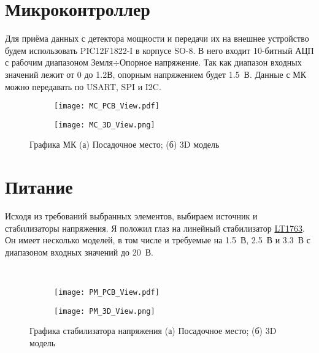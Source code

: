 \section{Микроконтроллер}

Для приёма данных с детектора мощности и передачи их на внешнее устройство будем использовать PIC12F1822-I в корпусе SO-8. В него входит 10-битный АЦП с рабочим диапазоном Земля$\div$Опорное напряжение. Так как диапазон входных значений лежит от 0 до 1.2В, опорным напряжением будет 1.5~В. Данные с МК можно передавать по USART, SPI и I2C.


\begin{figure}[H]
	\centering
	\begin{subfigure}[b]{0.45\textwidth}
		\centering
		\texttt{[image: MC\_PCB\_View.pdf]}
		\caption{}%
		\label{fig:MC_PCB_View}
	\end{subfigure}
	\hfill
	\begin{subfigure}[b]{0.45\textwidth}
		\centering
		\texttt{[image: MC\_3D\_View.png]}
		\caption{}%
		\label{fig:MC_3D_View}
	\end{subfigure}
	\caption{%
		Графика МК
		(а) Посадочное место;
		(б) 3D модель
	}%
	\label{fig:MC_footprint}
\end{figure}

\section{Питание}

Исходя из требований выбранных элементов, выбираем источник и стабилизаторы напряжения. Я положил глаз на линейный стабилизатор \href{https://www.analog.com/ru/products/lt1763.html}{LT1763}. Он имеет несколько моделей, в том числе и требуемые на 1.5~В, 2.5~В и 3.3~В с диапазоном входных значений до 20~В.

\begin{figure}[H]
	\centering\
	\begin{subfigure}[b]{0.45\textwidth}
		\centering
		\texttt{[image: PM\_PCB\_View.pdf]}
		\caption{}%
		\label{fig:PM_PCB_View}
	\end{subfigure}
	\hfill
	\begin{subfigure}[b]{0.45\textwidth}
		\centering
		\texttt{[image: PM\_3D\_View.png]}
		\caption{}%
		\label{fig:PM_3D_View}
	\end{subfigure}
	\caption{%
		Графика стабилизатора напряжения
		(а) Посадочное место;
		(б) 3D модель
	}%
	\label{fig:PM_footprint}
\end{figure}

